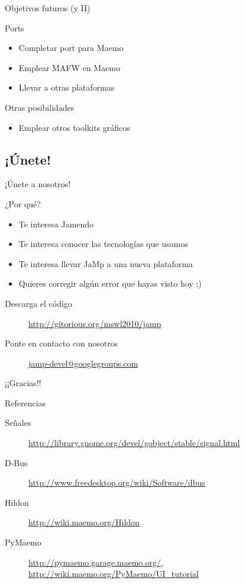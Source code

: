 \documentclass{beamer}
\begin{document}
\begin{frame}{Objetivos futuros (y II)}
\begin{block}{Ports}
\begin{itemize}
  \item Completar port para Maemo
  \item Emplear MAFW en Maemo
  \item Llevar a otras plataformas
\end{itemize}
\end{block}
\begin{block}{Otras posibilidades}
\begin{itemize}
  \item Emplear otros toolkits gráficos
\end{itemize}
\end{block}
\end{frame}

\subsection{¡Únete!}

\begin{frame}{¡Únete a nosotros!}
\begin{block}{¿Por qué?}
\begin{itemize}
  \item Te interesa Jamendo
  \item Te interesa conocer las tecnologías que usamos
  \item Te interesa llevar JaMp a una nueva plataforma
  \item Quieres corregir algún error que hayas visto hoy ;)
\end{itemize}
\end{block}
\begin{description}
\item[Descarga el código] \url{http://gitorious.org/mswl2010/jamp}
\item[Ponte en contacto con nosotros] \url{jamp-devel@googlegroups.com}
\end{description}
\end{frame}

\begin{frame}{¡¡Gracias!!}
\begin{center}
\end{center}
\end{frame}

\begin{frame}{Referencias}
\scriptsize{
\begin{description}
\item[Señales]
\url{http://library.gnome.org/devel/gobject/stable/signal.html}
\item[D-Bus] \url{http://www.freedesktop.org/wiki/Software/dbus}
\item[Hildon] \url{http://wiki.maemo.org/Hildon}
\item[PyMaemo] \url{http://pymaemo.garage.maemo.org/}, \url{http://wiki.maemo.org/PyMaemo/UI_tutorial}
\end{description}}
\end{frame}
\end{document}
